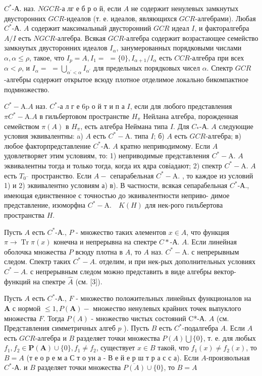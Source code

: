 \documentclass[10pt]{article}
\begin{document}
$C^{*}$-А. наз. $N G C R$-а лг е б р о й, если $A$ не содержит ненулевых замкнутых двусторонних $G C R$-идеалов (т. е. идеалов, являющихся $G C R$-алгебрами). Любая $C^{*}$-А. $A$ содержит максимальный двусторонний $G C R$ идеал $I$, и факторалгебра $A / I$ есть $N G C R$-алгебра. Всякая $G C R$-алгебра содержит возрастающее семейство замкнутых двусторонних идеалов $I_{\alpha}$, занумерованных порядковыми числами $\alpha, \alpha \leqslant \rho$, такое, что $I_{p}=A, I_{1}=$ $=\{0\}, I_{\alpha+1} / I_{\alpha}$ есть $C C R$-алгебра при всех $\alpha<\rho$, и $I_{\alpha}=$ $=\bigcup_{\alpha^{\prime}<\alpha} I_{\alpha^{\prime}}$ для предельных порядковых чисел $\alpha$. Спектр $G C R$-алгебры содержит открытое всюду плотное отделимое локально бикомпактное подмножество.



$C^{*}-\mathrm{A} . A$ наз. $C^{*}$-а л г е $6 \mathrm{p}$ о й т и п а $I$, если для любого представления $\pi C^{*}-\mathrm{A} . A$ в гильбертовом пространстве $H_{\pi}$ Нейлана алгебра, порожденная семейством $\pi(A)$ в $H_{\pi}$, есть алгебра Неймана типа $I$. Для $C_{*}$-А. $A$ следующие условия эквивалентны: a) $A$ есть $C^{*}-\mathrm{A}$. типа $I$; б) $A$ есть $G C R$-алгебра; в) любое факторпредставление $C^{*}$-А. $A$ кратно неприводимому. Если $A$ удовлетворяет этим условиям, то: 1) неприводимые представления $C^{*}-\mathrm{A}$. $A$ эквивалентны тогда и только тогда, когда их ядра совіадают; 2) спектр $C^{*}-\mathrm{A}$. $A$ есть $T_{0^{-}}$ пространство. Если $A-$ сепарабельная $C^{*}-\mathrm{A}$. , то каждое из условий 1) и 2) эквивалентно условиям а) в). В частности, всякая сепарабельная $C^{*}$-А., имеющая единственное с точностью до эквивалентности неприво- димое представление, изоморфна $C^{*}-\mathrm{A} . \quad K(H)$ для нек-рого гильбертова пространства $H$.



Пусть $A$ есть $C^{*}$-А., $P$ - множество таких әлементов $x \in A$, что функция $\pi \rightarrow \operatorname{Tr} \pi(x)$ конечна и непрерывна на спектре $C *$-А. $A$. Если линейная оболочка множества $P$ всюду плотна в $A$, то $A$ наз. $C^{*}-\mathrm{A}$. с непрерывным следом. Спектр таких $C^{*}-A$. отделим, и при нек-рых дополнительных условиях $C^{*}-A$. с непрерывным следом можно представить в виде алгебры вектор-функций на спектре $\hat{A}$ (см. [3]).



Пусть $A$ есть $C^{*}$-А., $F$ - множество положительных линейных функционалов на $\boldsymbol{A}$ с нормой $\leqslant 1, P(\boldsymbol{A})-$ множество ненулевых крайних точек выпуклого множества $F$. Тогда $P(A)$ - множество чистых состояний C*-А. $A$ (см. Представления симметричных алгеб $p$ ). Пусть $B$ есть $C^{*}$-подалгебра $A$. Если $A$ есть $G C R$-алгебра и $B$ разделяет точки множества $P(A) \bigcup\{0\}$, т. е. для любых $f_{1}, f_{2} \in \boldsymbol{P}(\boldsymbol{A}) \cup\{0\}, f_{1} \neq f_{2}$, существует $x \in B$ такой, что $f_{1}(x) \neq f_{2}(x)$, то $B=A$ (т е о р е м а С т о ун а - В е й е р ш т р а с с а). Если $A$-произвольная $C^{*}$-А. и $B$ разделяет точки множества $\overline{P(A)} \cup\{0\}$, то $B=A$
\end{document}
